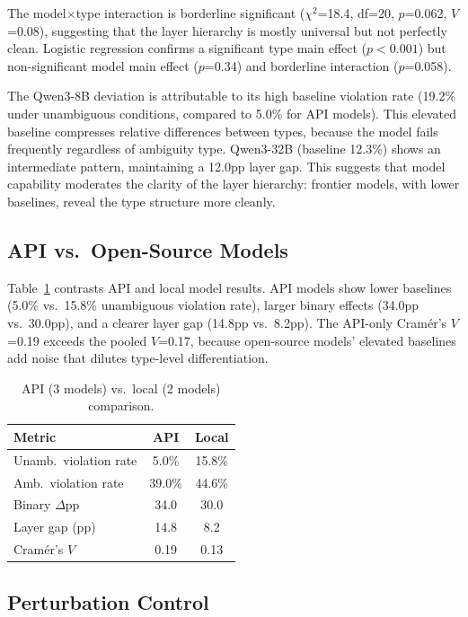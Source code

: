 \documentclass[11pt]{article}
\begin{document}
The model$\times$type interaction is borderline significant ($\chi^2$=18.4, df=20, $p$=0.062, $V$=0.08), suggesting that the layer hierarchy is mostly universal but not perfectly clean. Logistic regression confirms a significant type main effect ($p<0.001$) but non-significant model main effect ($p$=0.34) and borderline interaction ($p$=0.058).

The Qwen3-8B deviation is attributable to its high baseline violation rate (19.2\% under unambiguous conditions, compared to 5.0\% for API models). This elevated baseline compresses relative differences between types, because the model fails frequently regardless of ambiguity type. Qwen3-32B (baseline 12.3\%) shows an intermediate pattern, maintaining a 12.0pp layer gap. This suggests that model capability moderates the clarity of the layer hierarchy: frontier models, with lower baselines, reveal the type structure more cleanly.

\subsection{API vs.\ Open-Source Models}

Table~\ref{tab:api_local} contrasts API and local model results. API models show lower baselines (5.0\% vs.\ 15.8\% unambiguous violation rate), larger binary effects (34.0pp vs.\ 30.0pp), and a clearer layer gap (14.8pp vs.\ 8.2pp). The API-only Cram\'{e}r's $V$=0.19 exceeds the pooled $V$=0.17, because open-source models' elevated baselines add noise that dilutes type-level differentiation.

\begin{table}[t]
\centering
\small
\caption{API (3 models) vs.\ local (2 models) comparison.}
\label{tab:api_local}
\begin{tabular}{lcc}
\toprule
\textbf{Metric} & \textbf{API} & \textbf{Local} \\
\midrule
Unamb.\ violation rate & 5.0\% & 15.8\% \\
Amb.\ violation rate & 39.0\% & 44.6\% \\
Binary $\Delta$pp & 34.0 & 30.0 \\
Layer gap (pp) & 14.8 & 8.2 \\
Cram\'{e}r's $V$ & 0.19 & 0.13 \\
\bottomrule
\end{tabular}
\end{table}

\subsection{Perturbation Control}
\label{sec:perturbation}
\end{document}
